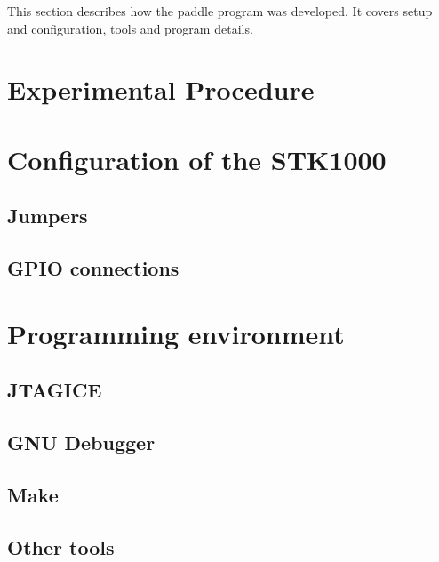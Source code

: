 This section describes how the paddle program was developed.
It covers setup and configuration, tools and program details.

\section{Experimental Procedure}
    
    

\section{Configuration of the STK1000}

    \subsection{Jumpers}

        

   \subsection{GPIO connections}

        

\section{Programming environment}

    \subsection{JTAGICE}

        

    \subsection{GNU Debugger}
        

    \subsection{Make}

        

    \subsection{Other tools}

